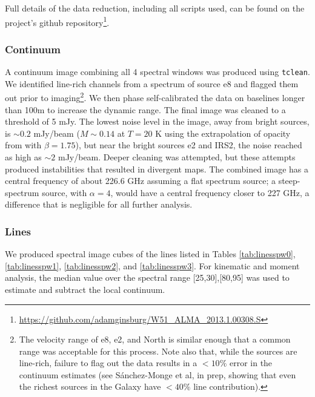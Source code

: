 \documentclass{emulateapj}
\begin{document}
Full details of the data reduction, including all scripts used, can be found on
the project's github
repository\footnote{\url{https://github.com/adamginsburg/W51_ALMA_2013.1.00308.S}}.


\subsubsection{Continuum}
A continuum image combining all 4 spectral windows was produced using
\texttt{tclean}.  We identified line-rich channels from a spectrum of source e8
and flagged them out prior to imaging\footnote{The velocity
range of e8, e2, and North is similar enough that a common range was acceptable
for this process.  Note also that, while the sources are line-rich,
failure to flag out the data results in a $<10\%$ error in the continuum estimates
(see S{\'a}nchez-Monge et al, in prep, showing that even the richest
sources in the Galaxy have $<40\%$ line contribution).}.  We then phase
self-calibrated the data on baselines longer than 100m to increase the dynamic
range.  The final image
was cleaned to a threshold of 5 mJy.  The lowest noise
level in the image, away from bright sources, is $\sim0.2$ mJy/beam
($M\sim0.14$ \msun at $T=20$ K using the extrapolation of
\citet{Ossenkopf1994a} opacity from \citet{Aguirre2011a} with $\beta=1.75$),
but near the bright sources e2 and IRS2, the noise reached as high as $\sim2$
mJy/beam.  Deeper cleaning was attempted, but these attempts produced
instabilities that resulted in divergent maps.  The combined image has a central
frequency of about 226.6 GHz assuming a flat spectrum source; a steep-spectrum
source, with $\alpha=4$, would have a central frequency closer to 227 GHz, a
difference that is negligible for all further analysis.


\subsubsection{Lines}
\label{sec:obslines}
We produced spectral image cubes of the lines listed in Tables
\ref{tab:linesspw0}, \ref{tab:linesspw1}, \ref{tab:linesspw2}, and
\ref{tab:linesspw3}.  For kinematic and moment analysis, the median value over
the spectral range [25,30],[80,95] \kms was used to estimate and subtract the
local continuum. 
\end{document}
